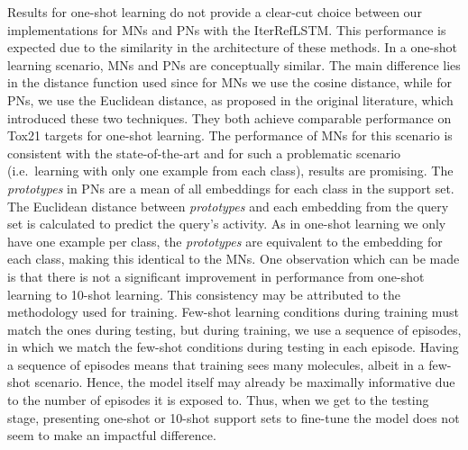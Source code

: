 Results for one-shot learning do not provide a clear-cut choice between our implementations for MNs and PNs with the IterRefLSTM. This performance is expected due to the similarity in the architecture of these methods. In a one-shot learning scenario, MNs and PNs are conceptually similar. The main difference lies in the distance function used since for MNs we use the cosine distance, while for PNs, we use the Euclidean distance, as proposed in the original literature, which introduced these two techniques. They both achieve comparable performance on Tox21 targets for one-shot learning. The performance of MNs for this scenario is consistent with the state-of-the-art and for such a problematic scenario (i.e.\ learning with only one example from each class), results are promising. The \textit{prototypes} in PNs are a mean of all embeddings for each class in the support set. The Euclidean distance between \textit{prototypes} and each embedding from the query set is calculated to predict the query's activity. As in one-shot learning we only have one example per class, the \textit{prototypes} are equivalent to the embedding for each class, making this identical to the MNs. One observation which can be made is that there is not a significant improvement in performance from one-shot learning to 10-shot learning. This consistency may be attributed to the methodology used for training. Few-shot learning conditions during training must match the ones during testing, but during training, we use a sequence of episodes, in which we match the few-shot conditions during testing in each episode. Having a sequence of episodes means that training sees many molecules, albeit in a few-shot scenario. Hence, the model itself may already be maximally informative due to the number of episodes it is exposed to. Thus, when we get to the testing stage, presenting one-shot or 10-shot support sets to fine-tune the model does not seem to make an impactful difference. 


